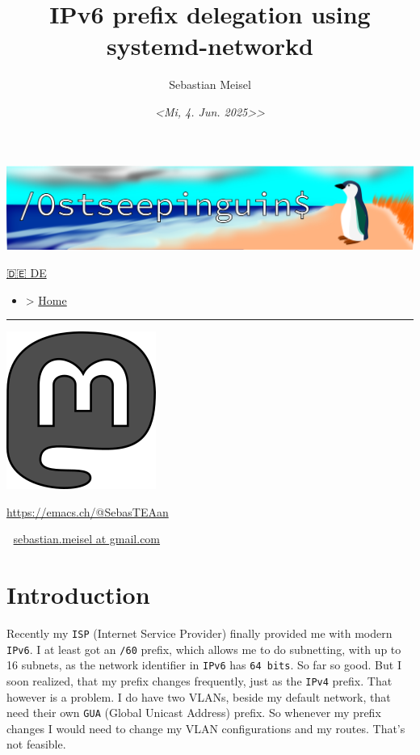 \documentclass[11pt]{article}
\author{Sebastian Meisel}
\date{\textit{<Mi,  4. Jun. 2025>>}}
\title{IPv6 prefix delegation using systemd-networkd}
\begin{document}
\maketitle

\begin{center}
\includegraphics[width=.65\linewidth]{img/Ostseepinguin.png}
\end{center}


\begin{menu}
\href{NetworkNamespace.DE.html}{🇩🇪 DE}
\begin{itemize}
\item > \href{index.html}{Home}
\end{itemize}

\noindent\rule{\textwidth}{0.5pt}
\begin{center}
\includegraphics[width=.65\linewidth]{img/Mastodon.png}
\end{center} \url{https://emacs.ch/@SebasTEAan}

📧 \href{mailto:sebastian.meisel+ostseepinguin@gmail.com}{sebastian.meisel at gmail.com}
\end{menu}

\section*{Introduction}
\label{sec:orgb6dc759}

Recently my \texttt{ISP} (Internet Service Provider) finally provided me with modern \texttt{IPv6}. I at least got an \texttt{/60} prefix, which allows me to do subnetting, with up to 16 subnets, as the network identifier in \texttt{IPv6} has \texttt{64 bits}. So far so good. But I soon realized, that my prefix changes frequently, just as the \texttt{IPv4} prefix. That however is a problem. I do have two VLANs, beside my default network, that need their own \texttt{GUA} (Global Unicast Address) prefix. So whenever my prefix changes I would need to change my VLAN configurations and my routes. That's not feasible.
\end{document}
